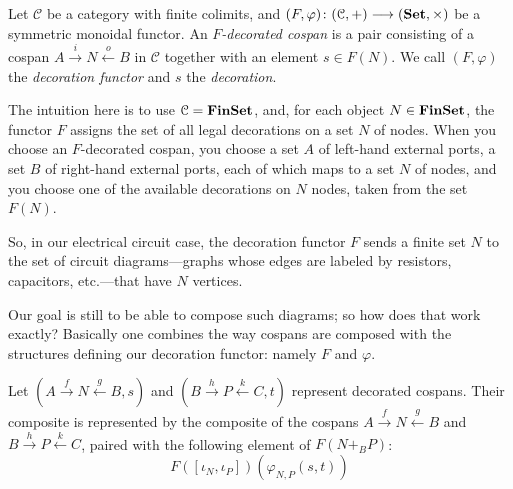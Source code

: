 \documentclass[7Sketches]{subfiles}
\begin{document}
\begin{definition}%
\label{def.decorated_cospan}%
%
%
  Let $\mathcal C$ be a category with finite colimits, and $(F,\varphi) \colon  (\mathcal
  C,+) \longrightarrow (\mathbf{Set}, \times)$
  be a symmetric monoidal functor. An \emph{$F$-decorated cospan} is a pair 
  consisting of a cospan $A \stackrel{i}\rightarrow N \stackrel{o}\leftarrow B$ in
  $\mathcal C$ together with an element $s \in F(N)$.%
  We call $(F,\varphi)$ the \emph{decoration functor} and $s$ the
  \emph{decoration}.
\end{definition}

The intuition here is to use $\mathcal{C}=\mathbf{FinSet}$, and, for each object $N\in\mathbf{FinSet}$, the functor $F$ assigns the set of all legal decorations on a set $N$ of nodes. When you choose an $F$-decorated cospan, you choose a set $A$ of left-hand external ports, a set $B$ of right-hand external ports, each of which maps to a set $N$ of nodes, and you choose one of the available decorations on $N$ nodes, taken from the set $F(N)$.

So, in our electrical circuit case, the decoration functor $F$ sends a finite set
$N$ to the set of circuit diagrams---graphs whose edges are labeled by resistors, capacitors, etc.---that have $N$ vertices.

Our goal is still to be able to compose such diagrams; so how does that work exactly? Basically one combines the way cospans are composed with the structures defining our decoration functor: namely $F$ and $\varphi$.

Let $(A \xrightarrow{f} N \xleftarrow{g} B,s)$ and $(B \xrightarrow{h} P
\xleftarrow{k} C,t)$ represent decorated cospans. Their
composite is represented by the composite of the cospans $A \xrightarrow{f} N
\xleftarrow{g} B$ and $B \xrightarrow{h} P \xleftarrow{k} C$, paired with the
following element of $F(N+_BP)$:
\begin{equation} %
\label{eqn.compositedecoration}
F([\iota_N,\iota_P])(\varphi_{N,P}(s,t))%
\end{equation}%
\label{page.horrendous}
\end{document}
